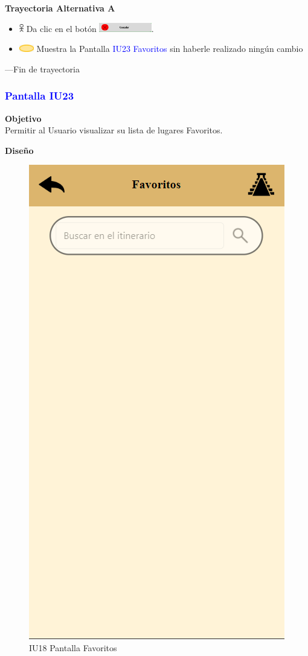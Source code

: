 \textbf{Trayectoria Alternativa A}
\begin{itemize}
    \item \includegraphics[width=0.0150\textwidth]{Figuras/persona.png} Da clic en el botón \includegraphics[width=0.180\textwidth]{ComponentesCU/img3.png}.
    \item \includegraphics[width=0.0500\textwidth]{Figuras/sistema.png} Muestra la Pantalla \textcolor{blue}{IU23 Favoritos} sin haberle realizado ningún cambio
    
\end{itemize}
---Fin de trayectoria

\vspace{15pt}

\subsubsection{\textcolor{blue}{Pantalla IU23}}

\textbf{Objetivo} \\
Permitir al Usuario visualizar su lista de lugares Favoritos.
\vspace{15pt}

\textbf{Diseño}

    \begin{figure}[h]
        
            \centering
            \includegraphics[width=.4\linewidth]{entregable final/pantallasSistema/IU18 Pantalla Favoritos.png}
        \caption{IU18 Pantalla Favoritos}
    
    \end{figure}

